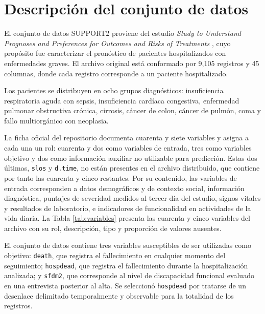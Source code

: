 \documentclass[11pt]{article}
\begin{document}
\section{Descripción del conjunto de datos}

El conjunto de datos SUPPORT2 proviene del estudio \textit{Study to Understand Prognoses and
Preferences for Outcomes and Risks of Treatments} \parencite{support2}, cuyo propósito fue
caracterizar el pronóstico de pacientes hospitalizados con enfermedades graves. El archivo
original está conformado por 9{,}105 registros y 45 columnas, donde cada registro corresponde a
un paciente hospitalizado.

Los pacientes se distribuyen en ocho grupos diagnósticos: insuficiencia respiratoria aguda con
sepsis, insuficiencia cardíaca congestiva, enfermedad pulmonar obstructiva crónica, cirrosis,
cáncer de colon, cáncer de pulmón, coma y fallo multiorgánico con neoplasia.

La ficha oficial del repositorio documenta cuarenta y siete variables y asigna a cada una un rol:
cuarenta y dos como variables de entrada, tres como variables objetivo y dos como información
auxiliar no utilizable para predicción. Estas dos últimas, \texttt{slos} y \texttt{d.time}, no
están presentes en el archivo distribuido, que contiene por tanto las cuarenta y cinco
restantes. Por su contenido, las variables de entrada corresponden a datos demográficos y
de contexto social, información diagnóstica, puntajes de severidad medidos al tercer día del
estudio, signos vitales y resultados de laboratorio, e indicadores de funcionalidad en
actividades de la vida diaria. La Tabla \ref{tab:variables} presenta las cuarenta y cinco
variables del archivo con su rol, descripción, tipo y proporción de valores ausentes.



El conjunto de datos contiene tres variables susceptibles de ser utilizadas como objetivo:
\texttt{death}, que registra el fallecimiento en cualquier momento del seguimiento;
\texttt{hospdead}, que registra el fallecimiento durante la hospitalización analizada; y
\texttt{sfdm2}, que corresponde al nivel de discapacidad funcional evaluado en una entrevista
posterior al alta. Se seleccionó \texttt{hospdead} por tratarse de un desenlace delimitado
temporalmente y observable para la totalidad de los registros.
\end{document}
